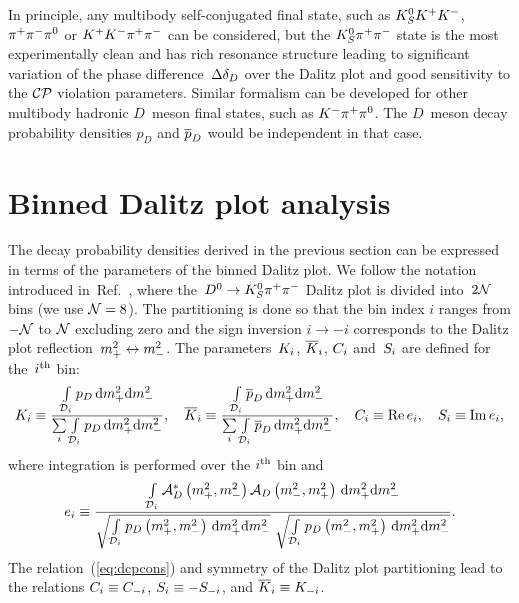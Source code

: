 \documentclass[a4paper,11pt]{article}
\begin{document}
In principle, any multibody self-conjugated final state, such as $K_S^0 K^+K^-$, 
$\pi^+\pi^-\pi^0$ or $K^+K^-\pi^+\pi^-$ can be considered, but the $K_S^0\pi^+\pi^-$ state is 
the most experimentally clean and has rich resonance structure leading to 
significant variation of the phase difference~$\Delta\delta_D$ over the Dalitz plot and
good sensitivity to the $\mathcal{CP}$ violation parameters.  
Similar formalism can be developed for other multibody hadronic $D$~meson 
final states, such as $K^-\pi^+\pi^0$.  The $D$~meson decay probability 
densities $p_D$ and $\overline{p}_D$ would be independent in that case.

\section{Binned Dalitz plot analysis}\label{sec:bins}
The decay probability densities derived in the previous section can be 
expressed in terms of the parameters of the binned Dalitz plot. We 
follow the notation introduced in~Ref.~\cite{BPV}, where the~$D^0 \to K_S^0\pi^+\pi^-$ 
Dalitz plot is divided into~$2\mathcal{N}$ bins (we use $\mathcal{N}=8$).  The partitioning 
is done so that the bin index $i$ ranges from $-\mathcal{N}$ to $\mathcal{N}$ excluding 
zero and the sign inversion $i\to -i$ corresponds to the Dalitz plot 
reflection~$m_+^2\leftrightarrow m_-^2$.  The parameters~$K_i$, $\overline{K}_i$, 
$C_i$ and~$S_i$ are defined for the~$i{^{\mathrm{th}}}$ bin:
\begin{equation}
 K_i    \equiv \frac{\int\limits_{\mathcal{D}_i}p_D\,\mathrm{d}m_+^2\mathrm{d}m_-^2}
                    {\sum\limits_i{\int\limits_{\mathcal{D}_i}p_D\,\mathrm{d}m_+^2\mathrm{d}m_-^2}},\quad
 \overline{K}_i \equiv \frac{\int\limits_{\mathcal{D}_i}\overline{p}_D\,\mathrm{d}m_+^2\mathrm{d}m_-^2}
                    {\sum\limits_i \int\limits_{\mathcal{D}_i}\overline{p}_D\,\mathrm{d}m_+^2\mathrm{d}m_-^2},\quad
 C_i    \equiv \mathrm{Re}\,e_i,\quad S_i \equiv \mathrm{Im}\,e_i,
\end{equation}
where integration is performed over the $i{^{\mathrm{th}}}$ bin and
\begin{equation}
 e_i \equiv \frac{\int\limits_{\mathcal{D}_i}\ad^{*}\dvar\ad\dvarinv\ddvar}
            {\sqrt{\int\limits_{\mathcal{D}_i}p_D\dvar\ddvar}
           \ \sqrt{\int\limits_{\mathcal{D}_i}p_D\dvarinv\ddvar}}.
\end{equation}
The relation~(\ref{eq:dcpcons}) and symmetry of the Dalitz plot 
partitioning lead to the relations $C_i \equiv C_{-i}$, $S_i \equiv -S_{-i}$, and 
$\overline{K}_i \equiv K_{-i}$.
\end{document}
